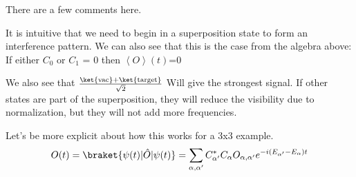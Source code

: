 There are a few comments here.

It is intuitive that we need to begin in a superposition state to form an interference pattern.
We can also see that this is the case from the algebra above:  If either $C_0$ or $C_1$ = 0 then $\left< O \right>(t)$=0

We also see that $\frac{ \ket{\text{vac}} + \ket{\text{target}} }{\sqrt{2}}$ Will give the strongest signal.
If other states are part of the superposition, they will reduce the visibility due to normalization, but they will not add more frequencies.

Let's be more explicit about how this works for a 3x3 example.
\begin{equation*}
    \begin{aligned}
        O(t) =\braket{\psi(t)|\hat{O}|\psi(t)} = \sum_{\alpha, \alpha^{\prime}} C^{*}_{\alpha^{\prime}} C_{\alpha} O_{\alpha, \alpha^{\prime}} e^{- i (E_{\alpha^{\prime}} - E_{\alpha}) t}   \\[2.0ex]
    \end{aligned}
\end{equation*}

